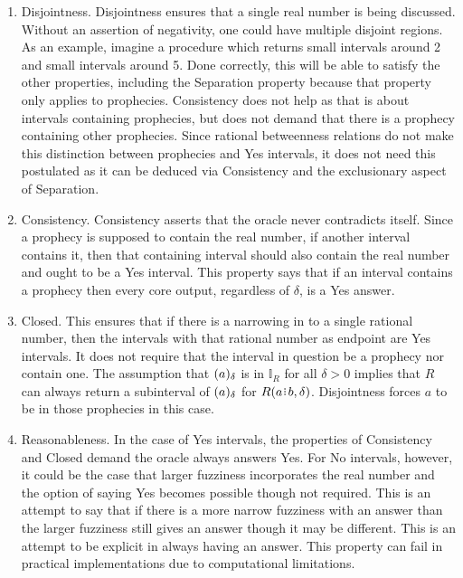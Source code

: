 \documentclass[12pt]{article}
\begin{document}
\begin{enumerate}
 
    \item Disjointness. Disjointness ensures that a single real number is being discussed. Without an assertion of negativity, one could have multiple disjoint regions.  As an example, imagine a procedure which returns small intervals around 2 and small intervals around 5. Done correctly, this will be able to satisfy the other properties, including the Separation property because that property only applies to prophecies. Consistency does not help as that is about intervals containing prophecies, but does not demand that there is a prophecy containing other prophecies.  Since rational betweenness relations do not make this distinction between prophecies and Yes intervals, it does not need this postulated as it can be deduced via Consistency and the exclusionary aspect of Separation. 
    
    \item Consistency. Consistency asserts that the oracle never contradicts itself. Since a prophecy is supposed to contain the real number, if another interval contains it, then that containing interval should also contain the real number and ought to be a Yes interval. This property says that if an interval contains a prophecy then every core output, regardless of $\delta$, is a Yes answer. 

    
    \item Closed. This ensures that if there is a narrowing in to a single rational number, then the intervals with that rational number as endpoint are Yes intervals. It does not require that the interval in question be a prophecy nor contain one. The assumption that $(a)_{\delta}$ is in $\mathbb{I}_R$ for all $\delta >0$ implies that $R$ can always return a subinterval of $(a)_{\delta}$ for $R(a\rint b, \delta)$. Disjointness forces $a$ to be in those prophecies in this case. 


    \item Reasonableness. In the case of Yes intervals, the properties of Consistency and Closed demand the oracle always answers Yes. For No intervals, however, it could be the case that larger fuzziness incorporates the real number and the option of saying Yes becomes possible though not required. This is an attempt to say that if there is a more narrow fuzziness with an answer than the larger fuzziness still gives an answer though it may be different. This is an attempt to be explicit in always having an answer. This property can fail in practical implementations due to computational limitations. 




\end{enumerate}
\end{document}
